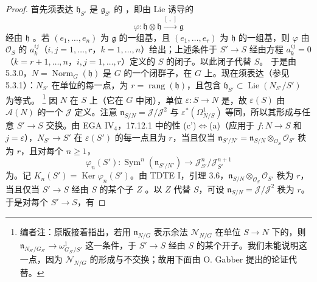 \begin{proof}
首先须表达 $\mathfrak h_{S'}$ 是 $\mathfrak g_{S'}$ 的 ，即由 Lie 诱导的
\[\varphi:\mathfrak h\otimes\mathfrak h\xrightarrow{[\ ,\ ]}\mathfrak g\]
经由 $\mathfrak h$ 。若 $(e_1,\ldots,e_n)$ 为 $\mathfrak g$ 的一组基，且 $(e_1,\ldots,e_r)$ 为 $\mathfrak h$ 的一组基，则 $\varphi$ 由 $\mathcal O_S$ 的 $a_k^{ij}$（$i,j=1,\ldots,r$，$k=1,\ldots,n$）给出；上述条件于 $S'\to S$ 经由方程 $a_k^{ij}=0$（$k=r+1,\ldots,n$，$i,j=1,\ldots,r$）定义的 $S$ 的闭子。以此闭子代替 $S$。
于是由 5.3.0，$N=\operatorname{Norm}_G(\mathfrak h)$ 是 $G$ 的一个闭群子，在 $G$ 上。现在须表达（参见 5.3.1）：$N_{S'}$ 在单位的每一点，为 $r=\operatorname{rang}(\mathfrak h)$，且包含 $\mathfrak h_{S'}\subset\operatorname{Lie}(N_{S'}/S')$ 为等式。
\footnote{编者注：原版接着指出，若用 $\mathfrak n_{N/G}$ 表示余法 $\mathcal N_{N/G}$ 在单位 $S\to N$ 下的，则 $\mathfrak n_{N_{S'}/G_{S'}}\to\omega^1_{G_{S'}/S'}$ 这一条件，于 $S'\to S$ 经由 $S$ 的某个开子。我们未能说明这一点，因为 $\mathcal N_{N/G}$ 的形成与不交换；故用下面由 O. Gabber 提出的论证代替。}
因 $N$ 在 $S$ 上（它在 $G$ 中闭），单位 $\varepsilon:S\to N$ 是，故 $\varepsilon(S)$ 由 $\mathcal A(N)$ 的一个 $\mathcal J$ 定义。注意 $\mathfrak n_{S/N}=\mathcal J/\mathcal J^2$ 与 $\varepsilon^*(\Omega^1_{N/S})$ 等同，所以其形成与任意 $S'\to S$ 交换。由 EGA IV$_4$，17.12.1 中的性 (c')$\Leftrightarrow$(a)（应用于 $f:N\to S$ 和 $j=\varepsilon$），$N_{S'}\to S'$ 在 $\varepsilon(S')$ 的每一点且为 $r$，当且仅当 $\mathfrak n_{S'/N'}=\mathfrak n_{S/N}\otimes_{\mathcal O_S}\mathcal O_{S'}$ 秩为 $r$，且对每个 $n\ge1$，
\[\varphi_n(S'):\operatorname{Sym}^n(\mathfrak n_{S'/N'})\longrightarrow\mathcal J_{S'}^n/\mathcal J_{S'}^{n+1}\]
为。记 $K_n(S')=\operatorname{Ker}\varphi_n(S')$。由 TDTE I，引理 3.6，$\mathfrak n_{S/N}\otimes_{\mathcal O_S}\mathcal O_{S'}$ 秩为 $r$，当且仅当 $S'\to S$ 经由 $S$ 的某个子 $Z$ 。以 $Z$ 代替 $S$，可设 $\mathfrak n_{S/N}=\mathcal J/\mathcal J^2$ 秩为 $r$。于是对每个 $S'\to S$，有

\end{proof}
